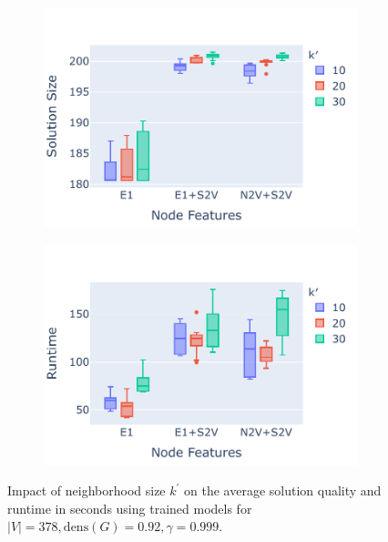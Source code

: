 \documentclass[draft,final]{vutinfth} %
\begin{document}
\begin{figure}
    \centering
    \begin{subfigure}{0.49\textwidth}
        \centering
        \includegraphics[width=\textwidth]{graphics/neighborhood-size.pdf}
    \end{subfigure}
    \begin{subfigure}{0.49\textwidth}
        \centering
        \includegraphics[width=\textwidth]{graphics/neighborhood-runtime.pdf}
    \end{subfigure}
    \caption{Impact of neighborhood size $k^\prime$ on the average solution quality and runtime in seconds using trained models for $|V|=378, \mathrm{dens}(G)=0.92, \gamma=0.999$.}
    \label{fig:neighborhood-size}
\end{figure}
\end{document}
